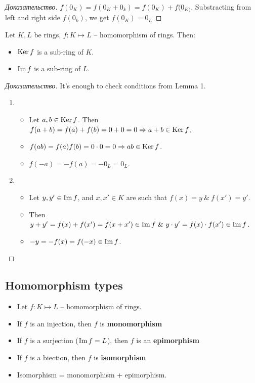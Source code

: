 \begin{proof}[Доказательство]
	$f(0_K) = f(0_K + 0 _{k}) = f(0_{K}) + f(0_{K)}$. Substracting from left and right side $f(0_{k})$, we get $f(0_{K}) = 0_{L}$
\end{proof}

\begin{lemma}
	Let $K, L$ be rings, $f: K \mapsto L$ -- homomorphism of rings. Then:
	\begin{itemize}
		\item $\operatorname{Ker} f$ is a sub-ring of $K$.
		\item $\operatorname{Im} f$ is a sub-ring of $L$.
	\end{itemize}
\end{lemma}
\begin{proof}[Доказательство]
	It's enough to check conditions from Lemma 1.
	\begin{enumerate}
		\item \begin{itemize}
			\item Let $a,b \in \operatorname{Ker} f$. Then $f(a+b)= f(a) + f(b) = 0 + 0 = 0 \Rightarrow a + b \in \operatorname{Ker} f$.
			\item $f(ab) = f(a)f(b) = 0 \cdot 0 = 0 \Rightarrow ab \in \operatorname{Ker} f$.
			\item $f(-a) = -f(a) = -0_{L} = 0_{L}$.
		\end{itemize}
		\item \begin{itemize}
			\item Let $y, y' \in \operatorname{Im} f$, and $x, x' \in K$ are such that $f(x) = y \ \& \ f(x') = y'$.
			\item Then $y + y' = f(x) + f(x') = f(x + x') \in \operatorname{Im} f \ \& \ y \cdot y' = f(x) \cdot f(x') \in \operatorname{Im} f$.
			\item $-y = -f(x) = f(-x) \in \operatorname{Im} f$.
		\end{itemize}
	\end{enumerate}
\end{proof}

\subsection{Homomorphism types}

\begin{itemize}
	\item Let $f: K \mapsto L$ -- homomorphism of rings.
	\item If $f$ is an injection, then  $f$ is \textbf{monomorphism}
	\item If $f$ is a surjection ($\operatorname{Im} f = L$), then  $f$ is an \bf{epimorphism}
	\item If $f$ is a biection, then $f$ is \textbf{isomorphism}
	\item Isomorphism = monomorphism + epimorphism.
\end{itemize}


